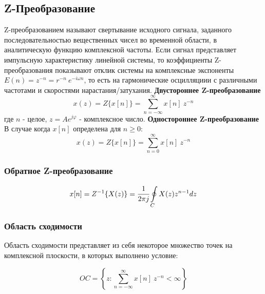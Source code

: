 \documentclass[12pt, a4paper]{article}
\begin{document}
\newpage
\subsection{Z-Преобразование}
Z-преобразованием называют свертывание исходного сигнала, заданного последовательностью вещественных чисел во временной области, в аналитическую функцию комплексной частоты. Если сигнал представляет импульсную характеристику линейной системы, то коэффициенты Z-преобразования показывают отклик системы на комплексные экспоненты $E(n) = z^{-n} = r^{-n}\ e^{-i \omega n}$, то есть на гармонические осцилляциии с различными частотами и скоростями нарастания/затухания.
\newline\newline
\textbf{Двустороннее Z-преобразование} \newline
$$ x(z) = Z\{x[n]\} = \sum\limits_{n=-\infty}^{\infty}{x[n]\ z^{-n}}$$
где $n$ - целое, $z = Ae^{j\varphi}$ - комплексное число.
\newline\newline
\textbf{Одностороннее Z-преобразование} \newline
В случае когда $x[n]$ определена для $n \ge 0$:
$$ x(z) = Z\{x[n]\} = \sum\limits_{n=0}^{\infty}{x[n]\ z^{-n}}$$

\subsubsection{Обратное Z-преобразование}

$$ x[n] = Z^{-1}\{X(z)\} = \cfrac{1}{2\pi j} \oint\limits_C{X(z)z^{n-1}dz} $$


\subsubsection{Область сходимости}
Область сходимости представляет из себя некоторое множество точек на комплексной плоскости, в которых выполнено условие:

$$ OC = \left\{ z : \sum\limits_{n=-\infty}^{\infty}{x[n]\ z^{-n}} < \infty  \right\} $$

\newpage
\end{document}
